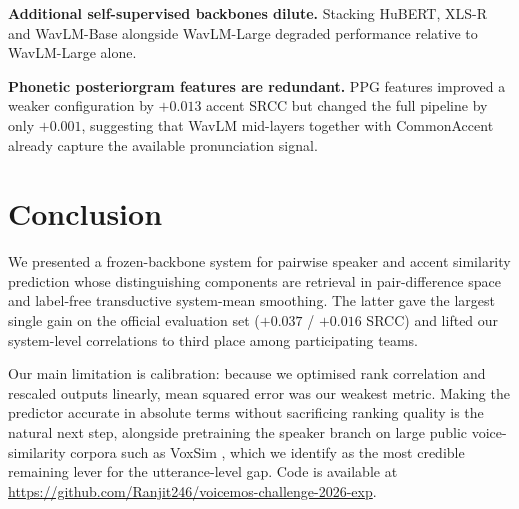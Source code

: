 \documentclass{article}
\begin{document}
\textbf{Additional self-supervised backbones dilute.} Stacking HuBERT, XLS-R and
WavLM-Base alongside WavLM-Large degraded performance relative to WavLM-Large
alone.

\textbf{Phonetic posteriorgram features are redundant.} PPG features improved a
weaker configuration by $+0.013$ accent SRCC but changed the full pipeline by
only $+0.001$, suggesting that WavLM mid-layers together with CommonAccent
already capture the available pronunciation signal.

\section{Conclusion}

We presented a frozen-backbone system for pairwise speaker and accent similarity
prediction whose distinguishing components are retrieval in pair-difference space
and label-free transductive system-mean smoothing. The latter gave the largest
single gain on the official evaluation set ($+0.037$ / $+0.016$ SRCC) and lifted
our system-level correlations to third place among participating teams.

Our main limitation is calibration: because we optimised rank correlation and
rescaled outputs linearly, mean squared error was our weakest metric. Making the
predictor accurate in absolute terms without sacrificing ranking quality is the
natural next step, alongside pretraining the speaker branch on large public
voice-similarity corpora such as VoxSim \cite{voxsim}, which we identify as the
most credible remaining lever for the utterance-level gap. Code is available at
\url{https://github.com/Ranjit246/voicemos-challenge-2026-exp}.
\end{document}
